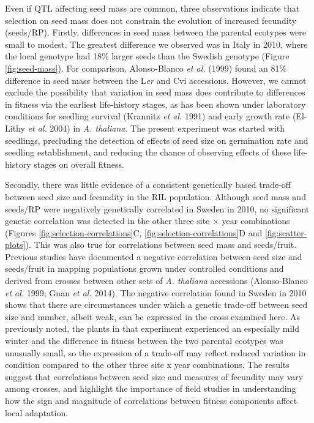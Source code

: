 \documentclass[
]{article}
\begin{document}
Even if QTL affecting seed mass are common, three observations indicate that selection on seed mass does not constrain the evolution of increased fecundity (seeds/RP). Firstly, differences in seed mass between the parental ecotypes were small to modest. The greatest difference we observed was in Italy in 2010, where the local genotype had 18\% larger seeds than the Swedish genotype (Figure \ref{fig:seed-mass}). For comparison, Alonso-Blanco \emph{et al.} (1999) found an 81\% difference in seed mass between the L\emph{er} and Cvi accessions. However, we cannot exclude the possibility that variation in seed mass does contribute to differences in fitness via the earliest life-history stages, as has been shown under laboratory conditions for seedling survival (Krannitz \emph{et al.} 1991) and early growth rate (El-Lithy \emph{et al.} 2004) in \emph{A. thaliana}. The present experiment was started with seedlings, precluding the detection of effects of seed size on germination rate and seedling establishment, and reducing the chance of observing effects of these life-history stages on overall fitness.

Secondly, there was little evidence of a consistent genetically based trade-off between seed size and fecundity in the RIL population. Although seed mass and seeds/RP were negatively genetically correlated in Sweden in 2010, no significant genetic correlation was detected in the other three site × year combinations (Figures \ref{fig:selection-correlations}C, \ref{fig:selection-correlations}D and \ref{fig:scatter-plots}). This was also true for correlations between seed mass and seeds/fruit. Previous studies have documented a negative correlation between seed size and seeds/fruit in mapping populations grown under controlled conditions and derived from crosses between other sets of \emph{A. thaliana} accessions (Alonso-Blanco \emph{et al.} 1999; Gnan \emph{et al.} 2014). The negative correlation found in Sweden in 2010 shows that there are circumstances under which a genetic trade-off between seed size and number, albeit weak, can be expressed in the cross examined here. As previously noted, the plants in that experiment experienced an especially mild winter and the difference in fitness between the two parental ecotypes was unusually small, so the expression of a trade-off may reflect reduced variation in condition compared to the other three site x year combinations. The results suggest that correlations between seed size and measures of fecundity may vary among crosses, and highlight the importance of field studies in understanding how the sign and magnitude of correlations between fitness components affect local adaptation.
\end{document}
